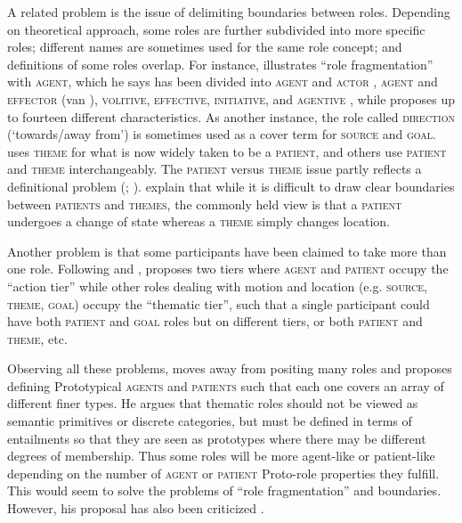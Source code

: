 \documentclass[output=paper]{langsci/langscibook}
\begin{document}
A related problem is the issue of delimiting boundaries between roles. Depending on theoretical approach, some roles are further subdivided into more specific roles; different names are sometimes used for the same role concept; and definitions of some roles overlap. For instance, \citet[553]{Dowty1991} illustrates “role fragmentation” with \textsc{agent,} which he says has been divided into \textsc{agent} and \textsc{actor} \citep{Jackendoff1983}, \textsc{agent} and \textsc{effector} (van \citealt{Valin1990}), \textsc{volitive}, \textsc{effective}, \textsc{initiative}, and \textsc{agentive} \citep{Cruse1973}, while \citet{Lakoff1977} proposes up to fourteen different characteristics. As another instance, the role called \textsc{direction} (‘towards/away from’) is sometimes used as a cover term for \textsc{source} and \textsc{goal.} \citet{Anderson1977} uses \textsc{theme} for what is now widely taken to be a \textsc{patient}, and others use \textsc{patient} and \textsc{theme} interchangeably. The \textsc{patient} versus \textsc{theme} issue partly reflects a definitional problem (\citealt[548-549]{Dowty1991}; \citealt[113]{Lobner2002}). \citet[5]{PalmerEtAl2010} explain that while it is difficult to draw clear boundaries between \textsc{patients} and \textsc{themes,} the commonly held view is that a \textsc{patient} undergoes a change of state whereas a \textsc{theme} simply changes location.

Another problem is that some participants have been claimed to take more than one role. Following \citet{CulicoverWilkins1986} and \citet{Talmy1985}, \citet[395]{Jackendoff1987} proposes two tiers where \textsc{agent} and \textsc{patient} occupy the “action tier” while other roles dealing with motion and location (e.g. \textsc{source, theme, goal}) occupy the “thematic tier”, such that a single participant could have both \textsc{patient} and \textsc{goal} roles but on different tiers, or both \textsc{patient} and \textsc{theme}, etc.

 Observing all these problems, \citet{Dowty1991} moves away from positing many roles and proposes defining Prototypical \textsc{agents} and \textsc{patient}\textsc{s} such that each one covers an array of different finer types. He argues that thematic roles should not be viewed as semantic primitives or discrete categories, but must be defined in terms of entailments so that they are seen as prototypes where there may be different degrees of membership. Thus some roles will be more agent-like or patient-like depending on the number of \textsc{agent} or \textsc{patient} Proto-role properties they fulfill. This would seem to solve the problems of “role fragmentation” and boundaries. However, his proposal has also been criticized \citep{LevinHovav1996}.
\end{document}
